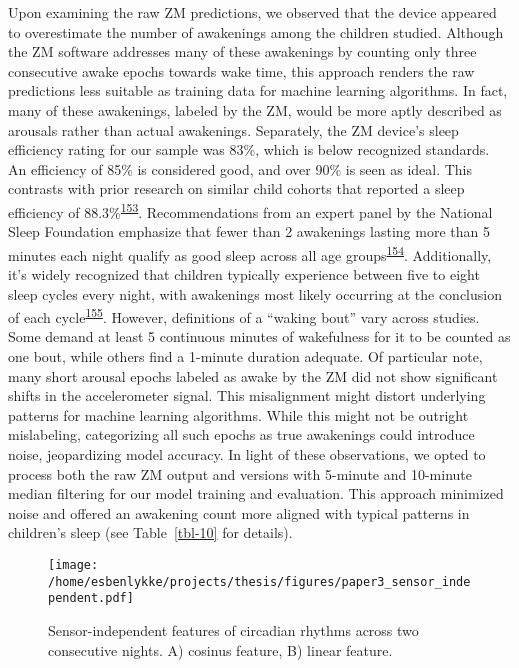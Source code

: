 \documentclass[
  10pt,
]{scrbook}
\begin{document}
Upon examining the raw ZM predictions, we observed that the device
appeared to overestimate the number of awakenings among the children
studied. Although the ZM software addresses many of these awakenings by
counting only three consecutive awake epochs towards wake time, this
approach renders the raw predictions less suitable as training data for
machine learning algorithms. In fact, many of these awakenings, labeled
by the ZM, would be more aptly described as arousals rather than actual
awakenings. Separately, the ZM device's sleep efficiency rating for our
sample was 83\%, which is below recognized standards. An efficiency of
85\% is considered good, and over 90\% is seen as ideal. This contrasts
with prior research on similar child cohorts that reported a sleep
efficiency of
88.3\%\textsuperscript{\protect\hyperlink{ref-galland_2018}{153}}.
Recommendations from an expert panel by the National Sleep Foundation
emphasize that fewer than 2 awakenings lasting more than 5 minutes each
night qualify as good sleep across all age
groups\textsuperscript{\protect\hyperlink{ref-ohayon_2017}{154}}.
Additionally, it's widely recognized that children typically experience
between five to eight sleep cycles every night, with awakenings most
likely occurring at the conclusion of each
cycle\textsuperscript{\protect\hyperlink{ref-galland_normal_2012}{155}}.
However, definitions of a ``waking bout'' vary across studies. Some
demand at least 5 continuous minutes of wakefulness for it to be counted
as one bout, while others find a 1-minute duration adequate. Of
particular note, many short arousal epochs labeled as awake by the ZM
did not show significant shifts in the accelerometer signal. This
misalignment might distort underlying patterns for machine learning
algorithms. While this might not be outright mislabeling, categorizing
all such epochs as true awakenings could introduce noise, jeopardizing
model accuracy. In light of these observations, we opted to process both
the raw ZM output and versions with 5-minute and 10-minute median
filtering for our model training and evaluation. This approach minimized
noise and offered an awakening count more aligned with typical patterns
in children's sleep (see Table~\ref{tbl-10} for details).

\begin{figure}

{\centering \texttt{[image: /home/esbenlykke/projects/thesis/figures/paper3\_sensor\_independent.pdf]}

}

\caption{\label{fig-paper3_sensor_independent}Sensor-independent
features of circadian rhythms across two consecutive nights. A) cosinus
feature, B) linear feature.}

\end{figure}
\end{document}
